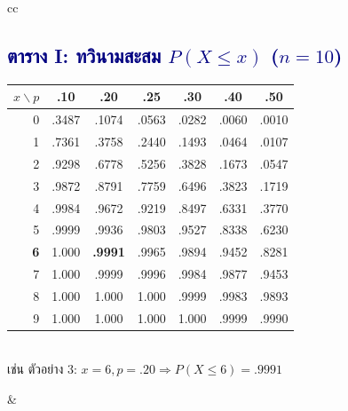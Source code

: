 \documentclass[9pt]{extarticle}
\begin{document}
\begin{center}
\begin{tabular}{cc}
\begin{minipage}{7.5cm}
\centering
\subsection*{\textcolor{navy}{ตาราง I: ทวินามสะสม $P(X\le x)$ ($n{=}10$)}}
\small
\begin{tabular}{r|cccccc}
\rowcolor{lightbg} $x\backslash p$ & .10 & .20 & .25 & .30 & .40 & .50\\\hline
0 & .3487 & .1074 & .0563 & .0282 & .0060 & .0010\\
1 & .7361 & .3758 & .2440 & .1493 & .0464 & .0107\\
2 & .9298 & .6778 & .5256 & .3828 & .1673 & .0547\\
3 & .9872 & .8791 & .7759 & .6496 & .3823 & .1719\\
4 & .9984 & .9672 & .9219 & .8497 & .6331 & .3770\\
5 & .9999 & .9936 & .9803 & .9527 & .8338 & .6230\\
\textbf{6} & 1.000 & \textbf{.9991} & .9965 & .9894 & .9452 & .8281\\
7 & 1.000 & .9999 & .9996 & .9984 & .9877 & .9453\\
8 & 1.000 & 1.000 & 1.000 & .9999 & .9983 & .9893\\
9 & 1.000 & 1.000 & 1.000 & 1.000 & .9999 & .9990\\
\end{tabular}\\[3pt]
\small เช่น ตัวอย่าง 3: $x{=}6,p{=}.20 \Rightarrow P(X\le6){=}.9991$
\end{minipage}
&
\begin{minipage}{7.5cm}
\centering

\end{minipage}
\end{tabular}
\end{center}
\end{document}
